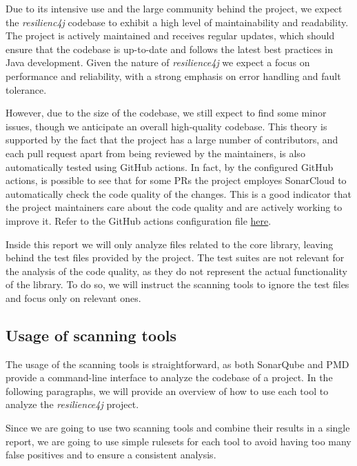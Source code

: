 Due to its intensive use and the large community behind the project, we expect the \textit{resilienc4j} codebase to exhibit a high level of maintainability and readability. The project is actively maintained and receives regular updates, which should ensure that the codebase is up-to-date and follows the latest best practices in Java development. Given the nature of \textit{resilience4j} we expect a focus on performance and reliability, with a strong emphasis on error handling and fault tolerance.

However, due to the size of the codebase, we still expect to find some minor issues, though we anticipate an overall high-quality codebase. This theory is supported by the fact that the project has a large number of contributors, and each pull request apart from being reviewed by the maintainers, is also automatically tested using GitHub actions. In fact, by the configured GitHub actions, is possible to see that for some PRs the project employes SonarCloud to automatically check the code quality of the changes. This is a good indicator that the project maintainers care about the code quality and are actively working to improve it. Refer to the GitHub actions configuration file \href{https://github.com/resilience4j/resilience4j/blob/master/.github/workflows/gradle-build.yml#L54}{here}.

Inside this report we will only analyze files related to the core library, leaving behind the test files provided by the project. The test suites are not relevant for the analysis of the code quality, as they do not represent the actual functionality of the library. To do so, we will instruct the scanning tools to ignore the test files and focus only on relevant ones.

\subsection{Usage of scanning tools}

The usage of the scanning tools is straightforward, as both SonarQube and PMD provide a command-line interface to analyze the codebase of a project. In the following paragraphs, we will provide an overview of how to use each tool to analyze the \textit{resilience4j} project.

Since we are going to use two scanning tools and combine their results in a single report, we are going to use simple rulesets for each tool to avoid having too many false positives and to ensure a consistent analysis.

